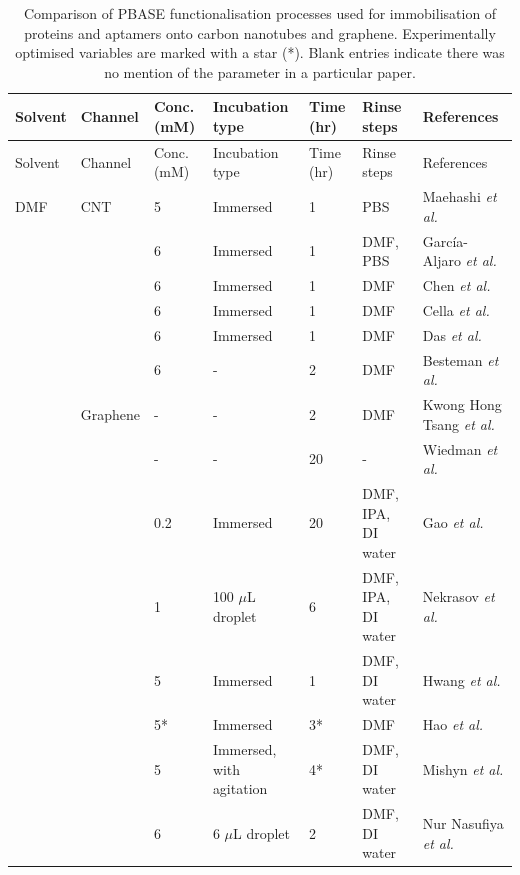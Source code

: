 \documentclass[
  a4paper,
]{scrbook}
\begin{document}
\newpage
{}

\hypertarget{tbl-pbase-functionalisation}{}
\begin{longtable}[]{@{}lllllll@{}}
\caption{\label{tbl-pbase-functionalisation}Comparison of PBASE
functionalisation processes used for immobilisation of proteins and
aptamers onto carbon nanotubes and graphene. Experimentally optimised
variables are marked with a star (*). Blank entries indicate there was
no mention of the parameter in a particular paper.}\tabularnewline
\toprule\noalign{}
Solvent & Channel & Conc. (mM) & Incubation type & Time (hr) & Rinse
steps & References \\
\midrule\noalign{}
\endfirsthead
\toprule\noalign{}
Solvent & Channel & Conc. (mM) & Incubation type & Time (hr) & Rinse
steps & References \\
\midrule\noalign{}
\endhead
\bottomrule\noalign{}
\endlastfoot
DMF & CNT & 5 & Immersed & 1 & PBS & Maehashi \textit{et al.}
\cite{Maehashi2007} \\
& & 6 & Immersed & 1 & DMF, PBS & García-Aljaro \textit{et al.}
\cite{Garcia-Aljaro2010} \\
& & 6 & Immersed & 1 & DMF & Chen \textit{et al.} \cite{Chen2001} \\
& & 6 & Immersed & 1 & DMF & Cella \textit{et al.} \cite{Cella2010} \\
& & 6 & Immersed & 1 & DMF & Das \textit{et al.} \cite{Das2011} \\
& & 6 & - & 2 & DMF & Besteman \textit {et al.} \cite{Besteman2003} \\
& Graphene & - & - & 2 & DMF & Kwong Hong Tsang \textit{et al.}
\cite{KwongHongTsang2019} \\
& & - & - & 20 & - & Wiedman \textit{et al.} \cite{Wiedman2017} \\
& & 0.2 & Immersed & 20 & DMF, IPA, DI water & Gao \textit{et al.}
\cite{Gao2018} \\
& & 1 & 100 \(\mu\)L droplet & 6 & DMF, IPA, DI water & Nekrasov
\textit{et al.} \cite{Nekrasov2021} \\
& & 5 & Immersed & 1 & DMF, DI water & Hwang \textit{et al.}
\cite{Hwang2016} \\
& & 5* & Immersed & 3* & DMF & Hao \textit{et al.} \cite{Hao2020} \\
& & 5 & Immersed, with agitation & 4* & DMF, DI water & Mishyn
\textit{et al.} \cite{Mishyn2022} \\
& & 6 & 6 \(\mu\)L droplet & 2 & DMF, DI water & Nur Nasufiya
\textit{et al.} \cite{NurNasyifa2020} \\

\end{longtable}
\end{document}
